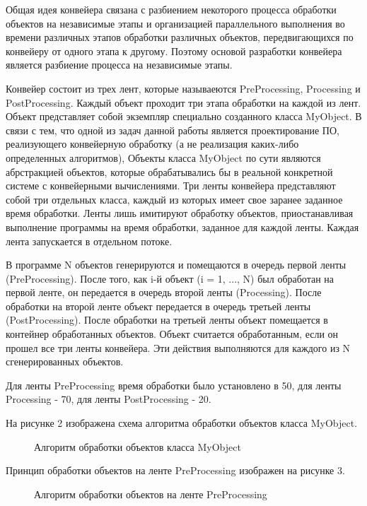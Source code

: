 \documentclass[a4paper,14pt]{report}
\begin{document}
Общая идея конвейера связана с разбиением некоторого процесса обработки объектов на независимые этапы и организацией параллельного выполнения во времени различных этапов обработки различных объектов, передвигающихся по конвейеру от одного этапа к другому.
Поэтому основой разработки конвейера является разбиение процесса на независимые этапы.

Конвейер состоит из трех лент, которые называеются PreProcessing, Processing и PostProcessing. Каждый объект проходит три этапа обработки на каждой из лент. Объект представляет собой экземпляр специально созданного класса MyObject. В связи с тем, что одной из задач данной работы является проектирование ПО, реализующего конвейерную обработку (а не реализация каких-либо определенных алгоритмов), Объекты класса MyObject по сути являются абрстракцией объектов, которые обрабатывались бы в реальной конкретной системе с конвейерными вычислениями. Три ленты конвейера представляют собой три отдельных класса, каждый из которых имеет свое заранее заданное время обработки. Ленты лишь имитируют обработку объектов, приостанавливая выполнение программы на время обработки, заданное для каждой ленты. Каждая лента запускается в отдельном потоке.

В программе N объектов генерируются и помещаются в очередь первой ленты (PreProcessing). После того, как i-й объект (i = 1, ..., N) был обработан на первой ленте, он передается в очередь второй ленты (Processing). После обработки на второй ленте объект передается в очередь третьей ленты (PostProcessing). После обработки на третьей ленты объект помещается в контейнер обработанных объектов. Объект считается обработанным, если он прошел все три ленты конвейера. Эти действия выполняются для каждого из N сгенерированных объектов.

Для ленты PreProcessing время обработки было установлено в 50, для ленты Processing - 70, для ленты PostProcessing - 20.

На рисунке 2 изображена схема алгоритма обработки объектов класса MyObject.

\begin{figure}
\caption{Алгоритм обработки объектов класса MyObject}
\label{fig:image}
\end{figure}

Принцип обработки объектов на ленте PreProcessing изображен на рисунке 3.

\begin{figure}
\caption{Алгоритм обработки объектов на ленте PreProcessing}
\label{fig:image}
\end{figure}
\end{document}
